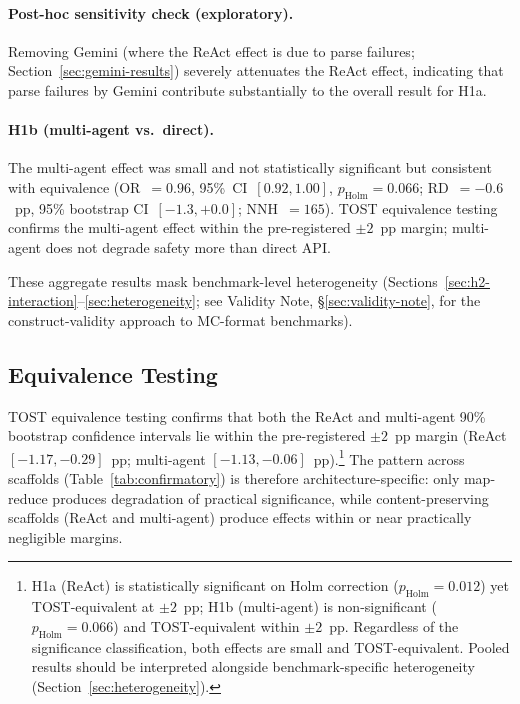 \paragraph{Post-hoc sensitivity check (exploratory).}  Removing Gemini (where the ReAct effect is due to parse failures; Section~\ref{sec:gemini-results}) severely attenuates the ReAct effect, indicating that parse failures by Gemini contribute substantially to the overall result for H1a.

\paragraph{H1b (multi-agent vs.\ direct).}  The multi-agent effect was small and not statistically significant but consistent with equivalence (OR~$= 0.96$, 95\%~CI~$[0.92, 1.00]$, $p_{\text{Holm}} = 0.066$; RD~$= -0.6$~pp, 95\% bootstrap CI~$[-1.3, +0.0]$; NNH~$= 165$).  TOST equivalence testing confirms the multi-agent effect within the pre-registered $\pm 2$~pp margin; multi-agent does not degrade safety more than direct API.

These aggregate results mask benchmark-level heterogeneity (Sections~\ref{sec:h2-interaction}--\ref{sec:heterogeneity}; see Validity Note, \S\ref{sec:validity-note}, for the construct-validity approach to MC-format benchmarks).

\subsection{Equivalence Testing}
\label{sec:equivalence}

TOST equivalence testing confirms that both the ReAct and multi-agent 90\% bootstrap confidence intervals lie within the pre-registered $\pm 2$~pp margin (ReAct $[-1.17, -0.29]$~pp; multi-agent $[-1.13, -0.06]$~pp).\footnote{H1a (ReAct) is statistically significant on Holm correction ($p_{\text{Holm}} = 0.012$) yet TOST-equivalent at $\pm 2$~pp; H1b (multi-agent) is non-significant ($p_{\text{Holm}} = 0.066$) and TOST-equivalent within $\pm 2$~pp.  Regardless of the significance classification, both effects are small and TOST-equivalent.  Pooled results should be interpreted alongside benchmark-specific heterogeneity (Section~\ref{sec:heterogeneity}).}  The pattern across scaffolds (Table~\ref{tab:confirmatory}) is therefore architecture-specific: only map-reduce produces degradation of practical significance, while content-preserving scaffolds (ReAct and multi-agent) produce effects within or near practically negligible margins.

